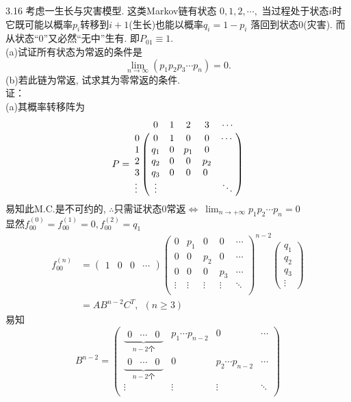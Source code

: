 3.16 考虑一生长与灾害模型. 这类Markov链有状态 $0,1,2,\cdots,$ 当过程处于状态$i$时它既可能以概率$p_i$转移到$i+1$(生长)也能以概率$q_i = 1 - p_i$ 落回到状态$0$(灾害). 而从状态“0”又必然“无中”生有. 即$P_{01} \equiv 1$.\\
(a)试证所有状态为常返的条件是
\[
\lim_{n \rightarrow \infty}(p_1p_2p_3\cdots p_n) = 0.
\]
(b)若此链为常返, 试求其为零常返的条件.\\
证：\\
(a)其概率转移阵为
\[
P = 
\bordermatrix{
	~ & 0   & 1 & 2   & 3   & \cdots \cr
	0 & 0   & 1 & 0   & 0   & \cdots \cr
	1 & q_1 & 0 & p_1 & 0   & ~ \cr
	2 & q_2 & 0 & 0   & p_2 & ~ \cr
	3 & q_3 & 0 & 0   & 0 ~ \cr
	\vdots & \vdots & ~ & ~ & ~ & \ddots \cr
}
\]
易知此M.C.是不可约的, $\therefore$只需证状态$0$常返$\Leftrightarrow~\lim_{n\rightarrow +\infty}p_1p_2\cdots p_n = 0$\\
显然$f^{(0)}_{00} = f^{(1)}_{00} = 0, f^{(2)}_{00} = q_1$
\[
\begin{split}
f^{(n)}_{00} & = 
\begin{pmatrix}
1 & 0 & 0 & \cdots
\end{pmatrix}
\begin{pmatrix}
0 & p_1 & 0 & 0 & \cdots\\
0 & 0 & p_2 & 0 & \cdots\\
0 & 0 & 0 & p_3 & \cdots\\
\vdots & \vdots & \vdots & \vdots & \ddots\\
\end{pmatrix}^{n-2}
\begin{pmatrix}
q_1\\
q_2\\
q_3\\
\vdots
\end{pmatrix}\\
& = AB^{n-2}C^T, ~~(n\geqslant 3)
\end{split}
\]
易知
\[
B^{n-2} = 
\begin{pmatrix}
\underbrace{\begin{matrix}0 & \cdots & 0\end{matrix}}_{n-2\text{个}} & p_1\cdots p_{n-2} & 0 & \cdots \\
\underbrace{\begin{matrix}0 & \cdots & 0\end{matrix}}_{n-2\text{个}} & 0 & p_2\cdots p_{n-2} & \cdots \\
\vdots & \vdots & \vdots & \ddots\\
\end{pmatrix}
\]
